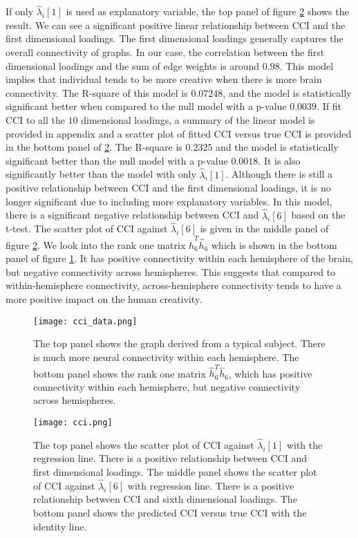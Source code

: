 \documentclass[10pt,journal,compsoc]{IEEEtran}
\begin{document}
\noindent If only $\hat{\lambda}_i[1]$ is used as explanatory variable, the top panel of figure \ref{fig:cci} shows the result. We can see a significant positive linear relationship between CCI and the first dimensional loadings. The first dimensional loadings generally captures the overall connectivity of graphs. In our case, the correlation between the first dimensional loadings and the sum of edge weights is around $0.98$. This model implies that individual tends to be more creative when there is more brain connectivity. The R-square of this model is $0.07248$, and the model is statistically significant better when compared to the null model with a p-value $0.0039$. If fit CCI to all the $10$ dimensional loadings, a summary of the linear model is provided in appendix and a scatter plot of fitted CCI versus true CCI is provided in the bottom panel of \ref{fig:cci}. The R-square is $0.2325$ and the model is statistically significant better than the null model with a p-value $0.0018$. It is also significantly better than the model with only $\hat{\lambda}_i[1]$. Although there is still a positive relationship between CCI and the first dimensional loadings, it is no longer significant due to including more explanatory variables. In this model, there is a significant negative relationship between CCI and $\hat{\lambda}_i[6]$ based on the t-test. The scatter plot of CCI against $\hat{\lambda}_i[6]$ is given in the middle panel of figure \ref{fig:cci}. We look into the rank one matrix $\hat{h}_6^T\hat{h}_6$ which is shown in the bottom panel of figure \ref{fig:cci1}. It has positive connectivity within each hemisphere of the brain, but negative connectivity across hemispheres. This suggests that compared to within-hemisphere connectivity, across-hemisphere connectivity tends to have a more positive impact on the human creativity. 

\begin{figure}[!htbp]
	\centering
	\texttt{[image: cci\_data.png]}
	\caption{The top panel shows the graph derived from a typical subject. There is much more neural connectivity within each hemisphere. The bottom panel shows the rank one matrix $\hat{h}_6^T\hat{h}_6$, which has positive  connectivity within each hemisphere, but negative  connectivity across hemispheres.  }
	\label{fig:cci1}
\end{figure} 

\begin{figure}[!htbp]
	\centering
	\texttt{[image: cci.png]}
	\caption{The top panel shows the scatter plot of CCI against $\hat{\lambda}_i[1]$ with the regression line. There is a positive relationship between CCI and first dimensional loadings. The middle panel shows the scatter plot of CCI against $\hat{\lambda}_i[6]$ with regression line. There is a positive relationship between CCI and sixth dimensional loadings. The bottom panel shows the predicted CCI versus true CCI with the identity line.}
	\label{fig:cci}
\end{figure}
\end{document}
